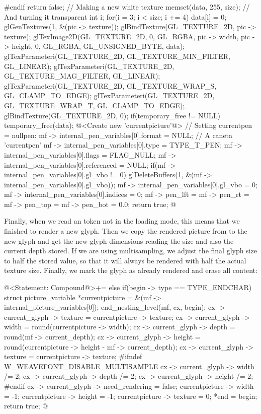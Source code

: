 {{{{{{{{#endif
      return false;
    }
    // Making a new white texture
    memset(data, 255, size);
    { // And turning it transparent
      int i;
      for(i = 3; i < size; i += 4)
        data[i] = 0;
    }
    glGenTextures(1, &(pic -> texture));
    glBindTexture(GL_TEXTURE_2D, pic -> texture);
    glTexImage2D(GL_TEXTURE_2D, 0, GL_RGBA, pic -> width, pic -> height, 0,
                 GL_RGBA, GL_UNSIGNED_BYTE, data);
    glTexParameteri(GL_TEXTURE_2D, GL_TEXTURE_MIN_FILTER, GL_LINEAR);
    glTexParameteri(GL_TEXTURE_2D, GL_TEXTURE_MAG_FILTER, GL_LINEAR);
    glTexParameteri(GL_TEXTURE_2D, GL_TEXTURE_WRAP_S, GL_CLAMP_TO_EDGE);
    glTexParameteri(GL_TEXTURE_2D, GL_TEXTURE_WRAP_T, GL_CLAMP_TO_EDGE);
    glBindTexture(GL_TEXTURE_2D, 0);
    if(temporary_free != NULL)
      temporary_free(data);
    @<Create new 'currentpicture'@>
  }
  { // Setting currentpen = nullpen:
    mf -> internal_pen_variables[0].format = NULL; // A caneta 'currentpen'
    mf -> internal_pen_variables[0].type = TYPE_T_PEN;
    mf -> internal_pen_variables[0].flags = FLAG_NULL;
    mf -> internal_pen_variables[0].referenced = NULL;
    if(mf -> internal_pen_variables[0].gl_vbo != 0)
      glDeleteBuffers(1, &(mf -> internal_pen_variables[0].gl_vbo));
    mf -> internal_pen_variables[0].gl_vbo = 0;
    mf -> internal_pen_variables[0].indices = 0;
    mf -> pen_lft = mf -> pen_rt = mf -> pen_top = mf -> pen_bot = 0.0;
  }
  return true;
}
@
\fimcodigo

Finally, when we read an  token not in the loading
mode, this means that we finished to render a new glyph. Then we copy
the rendered picture from  to the new glyph
and get the new glyph dimensions reading
the  size and also the current depth
stored. If we are using multisampling, we adjust the final glyph size
to half the stored value, so that it will always be rendered with half
the actual texture size. Finally, we mark the glyph as already rendered
and erase all  content:

\iniciocodigo
@<Statement: Compound@>+=
else if(begin -> type == TYPE_ENDCHAR){
  struct picture_variable *currentpicture =
                                        &(mf -> internal_picture_variables[0]);
  end_nesting_level(mf, cx, begin);
  cx -> current_glyph -> texture = currentpicture -> texture;
  cx -> current_glyph -> width = round(currentpicture -> width);
  cx -> current_glyph -> depth = round(mf -> current_depth);
  cx -> current_glyph -> height = round(currentpicture -> height -
                                        mf -> current_depth);
  cx -> current_glyph -> texture = currentpicture -> texture;
#ifndef W_WEAVEFONT_DISABLE_MULTISAMPLE
  cx -> current_glyph -> width /= 2;
  cx -> current_glyph -> depth /= 2;
  cx -> current_glyph -> height /= 2;
#endif
  cx -> current_glyph -> need_rendering = false;
  currentpicture -> width = -1;
  currentpicture -> height = -1;
  currentpicture -> texture = 0;
  *end = begin;
  return true;
}
@
\fimcodigo

}}}}}
